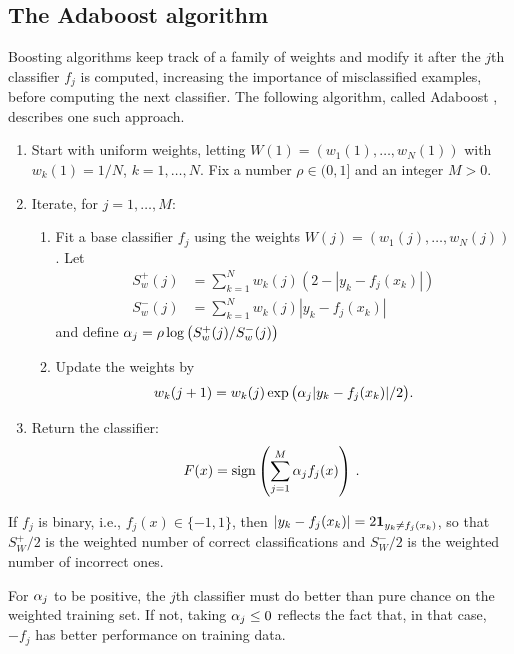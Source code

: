 \subsection{The Adaboost algorithm}
Boosting algorithms keep track of a family of weights and modify it after the $j$th classifier $f_j$ is computed, increasing the importance of misclassified examples, before computing the next classifier. The following algorithm, called Adaboost \cite{schapire1990strength,freund1997decision-theoretic}, describes one such approach.
\begin{algorithm}[Adaboost]
\label{alg:boosting}
\begin{enumerate}[label=$\bullet$]
\item Start with uniform weights, letting  $W(1) = (w_1(1), \ldots, w_N(1))$ with $w_k(1) = 1/N$, $k=1, \ldots, N$. Fix a number $\rho\in (0,1]$ and an integer $M>0$. 
\item Iterate, for $j=1, \ldots, M$:
\begin{enumerate}[wide=0.5cm]
\item Fit a base classifier $f_j$ using the weights $W(j) = (w_1(j), \ldots, w_N(j))$. Let
\begin{subequations}
\begin{align}
\label{eq:sw.1}
S_w^+(j) &= \sum_{k=1}^N w_k(j) (2-|y_k- f_j(x_k)|)\\
\label{eq:sw.2}
S_w^-(j) &= \sum_{k=1}^N w_k(j) |y_k -  f_j(x_k)|
\end{align}
\end{subequations}
and define $\alpha_j = \rho \log\big(S_w^+(j)/S_w^-(j)\big)$
\item Update the weights by
\[
w_k(j+1) = w_k(j) \exp\big(\alpha_j |y_k -  f_j(x_k)|/2\big).
\]
\end{enumerate} 
\item Return the classifier:
$$
F(x) = \text{sign}\left(\sum_{j=1}^M \alpha_j f_j(x)\right)\,.
$$
\end{enumerate}
\end{algorithm}
If $f_j$ is binary, i.e., $f_j(x) \in \{-1,1\}$, then $|y_k- f_j(x_k)| = 2 {\bm 1}_{y_k \neq f_j(x_k)}$, so that $S_W^+/2$ is the weighted number of correct classifications and $S_W^-/2$ is the weighted number of incorrect ones.

For $\alpha_j$ to be positive, the $j$th classifier must do
better than pure chance on the weighted training set. If not, taking $\alpha_j \leq 0$ reflects the fact that, in that case, $-f_j$ has better performance on training data.

